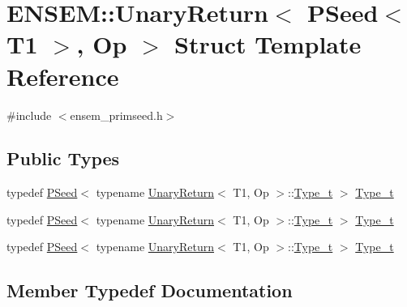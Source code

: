 \hypertarget{structENSEM_1_1UnaryReturn_3_01PSeed_3_01T1_01_4_00_01Op_01_4}{}\section{E\+N\+S\+EM\+:\+:Unary\+Return$<$ P\+Seed$<$ T1 $>$, Op $>$ Struct Template Reference}
\label{structENSEM_1_1UnaryReturn_3_01PSeed_3_01T1_01_4_00_01Op_01_4}


{\ttfamily \#include $<$ensem\+\_\+primseed.\+h$>$}

\subsection*{Public Types}
\begin{DoxyCompactItemize}
\item 
typedef \mbox{\hyperlink{classENSEM_1_1PSeed}{P\+Seed}}$<$ typename \mbox{\hyperlink{structENSEM_1_1UnaryReturn}{Unary\+Return}}$<$ T1, Op $>$\+::\mbox{\hyperlink{structENSEM_1_1UnaryReturn_3_01PSeed_3_01T1_01_4_00_01Op_01_4_a6145e0773bb5bec6d51ec81ef1837329}{Type\+\_\+t}} $>$ \mbox{\hyperlink{structENSEM_1_1UnaryReturn_3_01PSeed_3_01T1_01_4_00_01Op_01_4_a6145e0773bb5bec6d51ec81ef1837329}{Type\+\_\+t}}
\item 
typedef \mbox{\hyperlink{classENSEM_1_1PSeed}{P\+Seed}}$<$ typename \mbox{\hyperlink{structENSEM_1_1UnaryReturn}{Unary\+Return}}$<$ T1, Op $>$\+::\mbox{\hyperlink{structENSEM_1_1UnaryReturn_3_01PSeed_3_01T1_01_4_00_01Op_01_4_a6145e0773bb5bec6d51ec81ef1837329}{Type\+\_\+t}} $>$ \mbox{\hyperlink{structENSEM_1_1UnaryReturn_3_01PSeed_3_01T1_01_4_00_01Op_01_4_a6145e0773bb5bec6d51ec81ef1837329}{Type\+\_\+t}}
\item 
typedef \mbox{\hyperlink{classENSEM_1_1PSeed}{P\+Seed}}$<$ typename \mbox{\hyperlink{structENSEM_1_1UnaryReturn}{Unary\+Return}}$<$ T1, Op $>$\+::\mbox{\hyperlink{structENSEM_1_1UnaryReturn_3_01PSeed_3_01T1_01_4_00_01Op_01_4_a6145e0773bb5bec6d51ec81ef1837329}{Type\+\_\+t}} $>$ \mbox{\hyperlink{structENSEM_1_1UnaryReturn_3_01PSeed_3_01T1_01_4_00_01Op_01_4_a6145e0773bb5bec6d51ec81ef1837329}{Type\+\_\+t}}
\end{DoxyCompactItemize}


\subsection{Member Typedef Documentation}
\mbox{\label{structENSEM_1_1UnaryReturn_3_01PSeed_3_01T1_01_4_00_01Op_01_4_a6145e0773bb5bec6d51ec81ef1837329}} 
